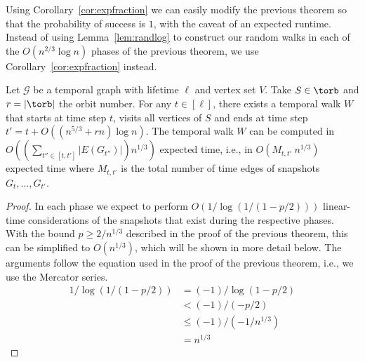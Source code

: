 {{ Using Corollary~\ref{cor:expfraction} we can easily modify the
    previous theorem so that the probability of success is $1$, with the caveat
    of an expected runtime. Instead of using Lemma~\ref{lem:randlog} to
    construct our random walks in each of the $O(n^{2/3}\log n)$ phases of the
    previous theorem, we use Corollary~\ref{cor:expfraction} instead. 

\begin{corollary}\label{cor:expectedorbitexplore} 
    Let $\mathcal{G}$ be a temporal graph with lifetime $\ell$ and vertex set
    $V$. Take $S \in \torb$ and $r=|\torb|$ the orbit number. For any
    $t\in[\ell]$, there exists a temporal walk $W$ that starts at time step
    $t$, visits all vertices of $S$ and ends at time step
    $t'=t+O((n^{5/3}+rn)\log n)$. The temporal walk $W$ can be computed 
    in
    $O((\sum_{t'' \in [t, t']} |E(G_{t''})|) n^{1/3})$ expected time, {i.e.,
    in $O( M_{t,t'} \ n^{1/3})$ expected time where $M_{t,t'}$ is the total number
    of time edges of snapshots $G_t, \ldots, G_{t'}$.}
\end{corollary}
\begin{proof}
    In each phase we expect to perform $O(1/\log(1/(1-p/2)))$ linear-time
    {considerations} of the snapshots that exist during the respective phases. With the
    bound $p \geq 2/n^{1/3}$ described in the proof of the previous theorem,
    this can be simplified to $O(n^{1/3})$, which will be shown in more detail
    below. The arguments follow the equation used in the proof of the previous
    theorem, i.e., we use the Mercator series.
    \begin{align*}
        1/\log(1/(1-p/2))                     &= (-1)/\log(1-p/2)\\
                                            &< (-1)/(-p/2)\\
                                            &\leq (-1)/(-1/n^{1/3})\\
                                            &=  n^{1/3}
    \end{align*}
\end{proof}
}
}
